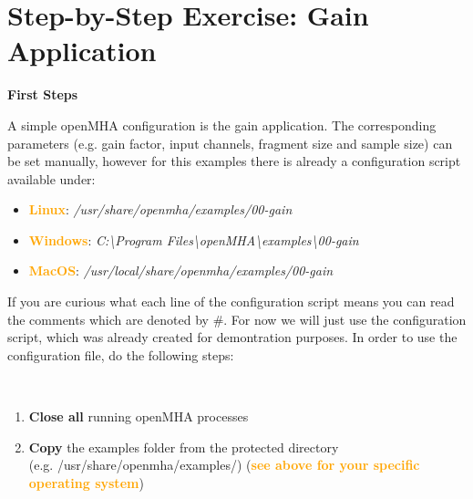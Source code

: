\documentclass[11pt,a4paper,twoside]{article}
\newcommand{\+}{\discretionary{\mbox{\scriptsize$\hookleftarrow$}}{}{}}
\begin{document}
{{{

\section{Step-by-Step Exercise: Gain Application}

\textbf{First Steps}
\label{sec:first_steps}

A simple openMHA configuration is the gain application. The corresponding parameters (e.g. gain factor, input channels, fragment size and sample size) can be set manually, however for this examples there is already a configuration script available under: 
\begin{itemize}
\item \textcolor{orange}{\textbf{Linux}}: \textit{/usr/share/openmha/examples/00-gain} 
\item \textcolor{orange}{\textbf{Windows}}: \textit{C:\textbackslash Program Files\textbackslash openMHA\textbackslash examples\textbackslash 00-gain}
\item \textcolor{orange}{\textbf{MacOS}}: \textit{/usr/local/share/openmha/examples/00-gain} 
\end{itemize}

If you are curious what each line of the configuration script means you can read the comments which are denoted by \#. For now we will just use the configuration script, which was already created for demontration purposes. In order to use the configuration file, do the following steps:

\dotfill \\

\begin{enumerate}
    \item \textbf{Close all} running openMHA processes
    
    \item \textbf{Copy} the examples folder from the protected directory
    \\ (e.g. /usr/share/openmha/examples/) (\textcolor{orange}{\textbf{see above for your specific operating system}})
   

\end{enumerate}}}}
\end{document}
